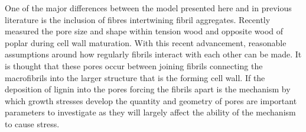 One of the major differences between the model presented here and in previous
literature is the inclusion of fibres intertwining fibril aggregates. Recently \cite{Chang_2014} measured the pore size and shape within tension wood and opposite
wood of poplar during cell wall maturation. With this recent advancement,
reasonable assumptions around how regularly fibrils interact with each other can be made. It is thought that these pores
occur between joining fibrils connecting the macrofibrils into the larger
structure that is the forming cell wall. If the deposition of lignin into the
pores forcing the fibrils apart is the mechanism by which growth stresses
develop the quantity and geometry of pores are important parameters to
investigate as they will largely affect the ability of the mechanism to cause
stress.